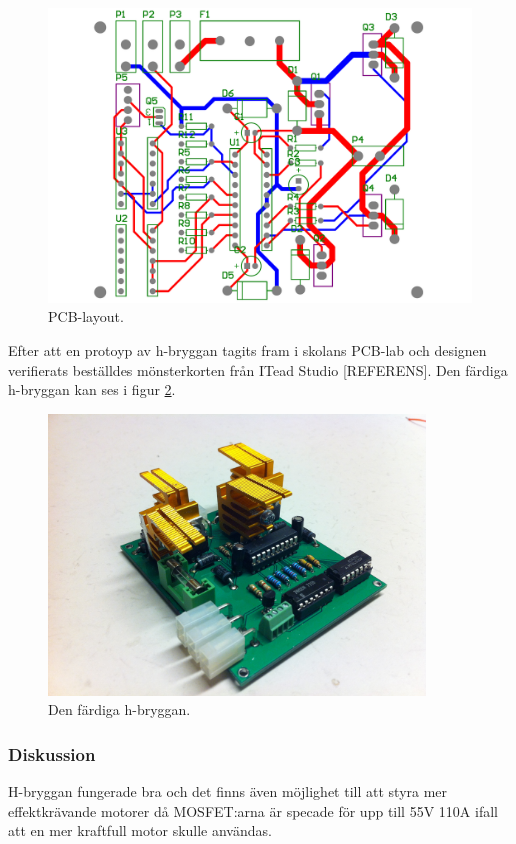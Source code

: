 \begin{figure}[htbp!]
\centering
\includegraphics[width=12cm]{../../includes/figures/H_brygga_pcb}
\caption{PCB-layout.}
\label{fig:pcb_layout}
\end{figure}

Efter att en protoyp av h-bryggan tagits fram i skolans PCB-lab och designen verifierats beställdes mönsterkorten från ITead Studio [REFERENS]. Den färdiga h-bryggan kan ses i figur \ref{fig:mounted_h_bridge}.

\begin{figure}[htbp!]
\centering
\includegraphics[width=10cm]{../../includes/figures/Hbridge}
\caption{Den färdiga h-bryggan.}
\label{fig:mounted_h_bridge}
\end{figure}

\subsubsection{Diskussion}
H-bryggan fungerade bra och det finns även möjlighet till att styra mer effektkrävande motorer då MOSFET:arna är specade för upp till 55V 110A ifall att en mer kraftfull motor skulle användas.

